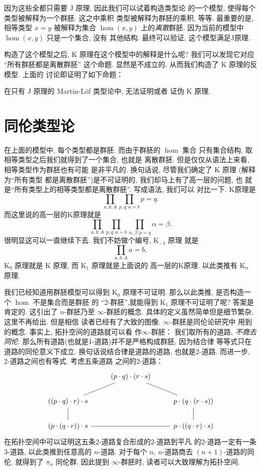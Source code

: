 因为这些全都只需要 J 原理, 因此我们可以试着构造类型论
的一个模型, 使得每个类型被解释为一个群胚. 这之中乘积
类型被解释为群胚的乘积, 等等. 最重要的是, 相等类型
\(x = y\) 被解释为集合 \(\hom(x,y)\) 上的\emph{离散}群胚.
因为当前的模型中 \(\hom(x,y)\) 只是一个集合, 没有
其他结构. 最终可以验证, 这个模型满足J原理.

构造了这个模型之后, K 原理在这个模型中的解释是什么呢?
我们可以发现它对应 “所有群胚都是离散群胚” 这个命题.
显然是不成立的. 从而我们构造了 K 原理的反模型. 上面的
讨论即证明了如下命题：
\begin{theorem}
在只有 J 原理的 Martin-L\"of 类型论中, 无法证明或者
证伪 K 原理.
\end{theorem}

\section{同伦类型论}
在上面的模型中, 每个类型都是群胚. 而由于群胚的 \(\hom\) 集合
只有集合结构, 取相等类型之后我们就得到了一个集合, 也就是
离散群胚. 但是仅仅从语法上来看, 相等类型作为群胚也有可能
是非平凡的. 换句话说, 尽管我们确定了 K 原理 (解释为“所有类型
都是离散群胚”)是不可证明的, 我们却马上有了高一层的问题, 也
就是“所有类型上的相等类型都是离散群胚”. 写成语法, 我们可以
对比一下. K原理是
\[\prod_{a,b : A} \prod_{p,q:a=b} p = q.\]
而这里说的高一层的K原理就是
\[\prod_{a,b : A} \prod_{p,q:a=b} \prod_{\alpha,\beta:p=q} \alpha = \beta.\]
很明显这可以一直继续下去. 我们不妨做个编号, K\(_{-1}\) 原理
就是
\[\prod_{a,b : A} a = b,\]
K\(_0\) 原理就是 K 原理, 而 K\(_1\) 原理就是上面说的
高一层的K原理. 以此类推有 K\(_n\) 原理.

我们已经知道用群胚模型可以得到 K\(_0\) 原理不可证明.
那么以此类推, 是否构造一个 \(\hom\) 不是集合而是群胚
的 “2-群胚”,就能得到 K\(_1\) 原理不可证明了呢? 答案是
肯定的. 这引出了 \(n\)-群胚乃至 \(\infty\)-群胚的概念.
具体的定义虽然简单但是细节繁杂, 这里不再给出. 但是相信
读者已经有了大致的图像. \(\infty\)-群胚是同伦论研究中
用到的概念. 事实上, 拓扑空间的道路就可以看
作\(\infty\)-群胚： 我们取所有的道路, \emph{不商去同伦}.
那么所有道路(也就是1-道路)并不是严格构成群胚, 因为结合律
等等式只在道路的同伦意义下成立. 换句话说结合律是道路的道路,
也就是2-道路. 而进一步, 2-道路之间也有等式. 考虑五条道路
之间的2-道路：
\[\begin{tikzcd}
& {(p\cdot q)\cdot (r\cdot s)} \\
{((p\cdot q)\cdot r)\cdot s} && {p\cdot (q\cdot (r\cdot s))} \\
{(p\cdot (q\cdot r))\cdot s} && {p\cdot ((q\cdot r)\cdot s)}
\arrow[no head, from=2-1, to=1-2]
\arrow[no head, from=2-1, to=3-1]
\arrow[no head, from=3-1, to=3-3]
\arrow[no head, from=3-3, to=2-3]
\arrow[no head, from=2-3, to=1-2]
\end{tikzcd}\]
在拓扑空间中可以证明这五条2-道路复合形成的2-道路到平凡
的2-道路一定有一条3-道路, 以此类推到任意高的 \(n\)-道路.
对于每个 \(n\), \(n\)-道路商去 \((n+1)\)-道路的同伦,
就得到了 \(\pi_n\) 同伦群. 因此提到 \(\infty\)-群胚时,
读者可以大致理解为拓扑空间.

